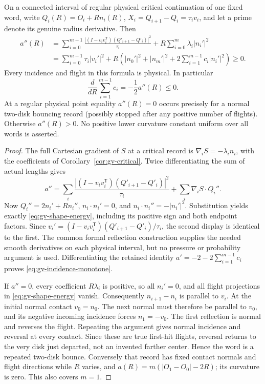 \begin{theorem}
\label{thm:gv-shape-energy}
On a connected interval of regular physical critical continuation of
one fixed word, write $Q_i(R)=O_i+Rn_i(R)$,
$X_i=Q_{i+1}-Q_i=\tau_i v_i$, and let a prime denote its genuine
radius derivative. Then
\begin{equation}\label{eq:gv-shape-energy}
 \begin{split}
 a''(R)
 &=\sum_{i=0}^{m-1}\frac{|(I-v_iv_i^{\mathsf T})
                          (Q'_{i+1}-Q'_i)|^2}{\tau_i}
       +R\sum_{i=0}^m\lambda_i|n_i'|^2\\
 &=\sum_{i=0}^{m-1}\tau_i|v_i'|^2
       +R\left(|n_0'|^2+|n_m'|^2
                  +2\sum_{i=1}^{m-1}c_i|n_i'|^2\right)\ge0.
 \end{split}
\end{equation}
Every incidence and flight in this formula is physical. In particular
\begin{equation}\label{eq:gv-incidence-monotone}
 \frac d{dR}\sum_{i=1}^{m-1}c_i=-\frac12a''(R)\le0.
\end{equation}
At a regular physical point equality $a''(R)=0$ occurs precisely
for a normal two-disk bouncing record (possibly stopped after any
positive number of flights). Otherwise $a''(R)>0$.
No positive lower curvature constant uniform over all words is asserted.
\end{theorem}
\begin{proof}
The full Cartesian gradient of $S$ at a critical record is
$\nabla_iS=-\lambda_i n_i$, with the coefficients of
Corollary~\ref{cor:gv-critical}. Twice differentiating the sum of
actual lengths gives
\[
 a''=\sum_i\frac{|(I-v_iv_i^{\mathsf T})(Q'_{i+1}-Q'_i)|^2}{\tau_i}
             +\sum_i\nabla_iS\cdot Q_i''.
\]
Now $Q_i''=2n_i'+Rn_i''$, $n_i\cdot n_i'=0$, and
$n_i\cdot n_i''=-|n_i'|^2$. Substitution yields exactly
\eqref{eq:gv-shape-energy}, including its positive sign and both
endpoint factors. Since
$v_i'=(I-v_iv_i^{\mathsf T})(Q'_{i+1}-Q'_i)/\tau_i$, the second
display is identical to the first. The common formal reflection
construction supplies the needed smooth derivatives on each physical
interval, but no pressure or probability argument is used.
Differentiating the retained identity
$a'=-2-2\sum_{i=1}^{m-1}c_i$ proves
\eqref{eq:gv-incidence-monotone}.

If $a''=0$, every coefficient $R\lambda_i$ is positive, so all
$n_i'=0$, and all flight projections in \eqref{eq:gv-shape-energy}
vanish. Consequently $n_{i+1}-n_i$ is parallel to $v_i$.
At the initial normal contact $v_0=n_0$. The next normal must
therefore be parallel to $v_0$, and its negative incoming incidence
forces $n_1=-v_0$. The first reflection is normal and reverses the
flight. Repeating the argument gives normal incidence and reversal
at every contact. Since these are true first-hit flights, reversal
returns to the very disk just departed, not an invented farther
center. Hence the word is a repeated two-disk bounce. Conversely
that record has fixed contact normals and flight directions while
$R$ varies, and $a(R)=m(|O_1-O_0|-2R)$; its curvature is zero.
This also covers $m=1$.
\end{proof}

